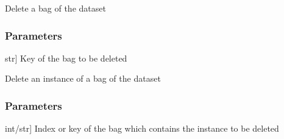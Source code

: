 \documentclass[letterpaper,10pt,english]{sphinxmanual}
\begin{document}
\begin{fulllineitems}
\begin{fulllineitems}
\begin{description}
\end{description}

\end{fulllineitems}


\begin{fulllineitems}
\label{\detokenize{data/_autosummary/miml.data.miml_dataset.MIMLDataset:miml.data.miml_dataset.MIMLDataset.delete_bag}}
\pysigstartsignatures
{}
\pysigstopsignatures
\sphinxAtStartPar
Delete a bag of the dataset


\subsubsection{Parameters}
\label{\detokenize{data/_autosummary/miml.data.miml_dataset.MIMLDataset:id4}}\begin{description}
\sphinxlineitem{key\_bag}{[}str{]}
\sphinxAtStartPar
Key of the bag to be deleted

\end{description}

\end{fulllineitems}


\begin{fulllineitems}
\label{\detokenize{data/_autosummary/miml.data.miml_dataset.MIMLDataset:miml.data.miml_dataset.MIMLDataset.delete_instance}}
\pysigstartsignatures
{}
\pysigstopsignatures
\sphinxAtStartPar
Delete an instance of a bag of the dataset


\subsubsection{Parameters}
\label{\detokenize{data/_autosummary/miml.data.miml_dataset.MIMLDataset:id5}}\begin{description}
\sphinxlineitem{bag}{[}int/str{]}
\sphinxAtStartPar
Index or key of the bag which contains the instance to be deleted


\end{description}
\end{fulllineitems}
\end{fulllineitems}
\end{document}
